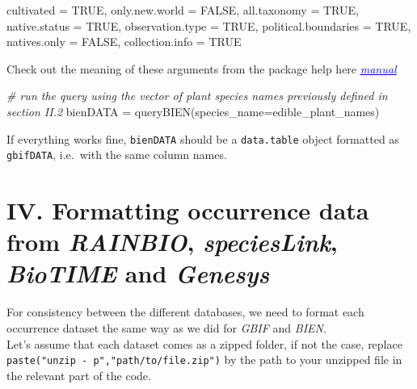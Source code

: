 \documentclass[
]{article}
\newenvironment{Shaded}{\begin{snugshade}}{\end{snugshade}}
\newcommand{\AttributeTok}[1]{\textcolor[rgb]{0.77,0.63,0.00}{#1}}
\newcommand{\CommentTok}[1]{\textcolor[rgb]{0.56,0.35,0.01}{\textit{#1}}}
\newcommand{\ConstantTok}[1]{\textcolor[rgb]{0.00,0.00,0.00}{#1}}
\newcommand{\FunctionTok}[1]{\textcolor[rgb]{0.00,0.00,0.00}{#1}}
\newcommand{\NormalTok}[1]{#1}
\newcommand{\OtherTok}[1]{\textcolor[rgb]{0.56,0.35,0.01}{#1}}
\begin{document}
\begin{Shaded}
\begin{Highlighting}[]
\NormalTok{cultivated }\OtherTok{=} \ConstantTok{TRUE}\NormalTok{,}
\NormalTok{only.new.world }\OtherTok{=} \ConstantTok{FALSE}\NormalTok{,}
\NormalTok{all.taxonomy }\OtherTok{=} \ConstantTok{TRUE}\NormalTok{,}
\NormalTok{native.status }\OtherTok{=} \ConstantTok{TRUE}\NormalTok{,}
\NormalTok{observation.type }\OtherTok{=} \ConstantTok{TRUE}\NormalTok{,}
\NormalTok{political.boundaries }\OtherTok{=} \ConstantTok{TRUE}\NormalTok{,}
\NormalTok{natives.only }\OtherTok{=} \ConstantTok{FALSE}\NormalTok{,}
\NormalTok{collection.info }\OtherTok{=} \ConstantTok{TRUE}
\end{Highlighting}
\end{Shaded}

Check out the meaning of these arguments from the package help here
\href{https://search.r-project.org/CRAN/refmans/BIEN/html/BIEN_occurrence_species.html}{\emph{\textcolor{blue}{\underline{manual}}}}

\begin{Shaded}
\begin{Highlighting}[]

\CommentTok{\# run the query using the vector of plant species names previously defined in section II.2 }
\NormalTok{bienDATA }\OtherTok{=} \FunctionTok{queryBIEN}\NormalTok{(}\AttributeTok{species\_name=}\NormalTok{edible\_plant\_names)}
\end{Highlighting}
\end{Shaded}

If everything works fine, \texttt{bienDATA} should be a
\texttt{data.table} object formatted as \texttt{gbifDATA}, i.e.~with the
same column names.

\hypertarget{iv.-formatting-occurrence-data-from-rainbio-specieslink-biotime-and-genesys}{%
\section{\texorpdfstring{IV. Formatting occurrence data from
\emph{RAINBIO}, \emph{speciesLink}, \emph{BioTIME} and
\emph{Genesys}}{IV. Formatting occurrence data from RAINBIO, speciesLink, BioTIME and Genesys}}\label{iv.-formatting-occurrence-data-from-rainbio-specieslink-biotime-and-genesys}}

For consistency between the different databases, we need to format each
occurrence dataset the same way as we did for \emph{GBIF} and
\emph{BIEN}.\\
Let's assume that each dataset comes as a zipped folder, if not the
case, replace \texttt{paste("unzip\ -\ p","path/to/file.zip")} by the
path to your unzipped file in the relevant part of the code.
\end{document}
